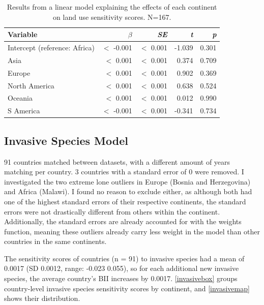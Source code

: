 \documentclass[11pt, a4paper, titlepage]{article}
\begin{document}
    \begin{table}[H]
    	\begin{center}
    		\caption{Results from a linear model explaining the effects of each continent on land use sensitivity scores. \textmd{N=167.}}
    		\label{tab:landuse}
    		\begin{tabular}{l|r|r|r|r} %
    			Variable & $\beta$ & \textit{SE} & \textit{t} & \textit{p}\\
    			\hline
    			Intercept (reference: Africa) & $<$ -0.001 & $<$ 0.001 & -1.039 & 0.301\\
    			Asia & $<$ 0.001 & $<$ 0.001 & 0.374 & 0.709\\
    			Europe & $<$ 0.001 & $<$ 0.001 & 0.902 & 0.369 \\
    			North America & $<$ 0.001 & $<$ 0.001 & 0.638 & 0.524\\
    			Oceania & $<$ 0.001 & $<$ 0.001 & 0.012 & 0.990\\
    			S America & $<$ -0.001 & $<$ 0.001 & -0.341 & 0.734\\
    		\end{tabular}
    	\end{center}
    \end{table}
    
    \newpage
	\subsection*{Invasive Species Model}

	
	91 countries matched between datasets, with a different amount of years matching per country. 3 countries with a standard error of 0 were removed. I investigated the two extreme lone outliers in Europe  (Bosnia and Herzegovina) and Africa (Malawi). I found no reason to exclude either, as although both had one of the highest standard errors of their respective continents, the standard errors were not drastically different from others within the continent. Additionally, the standard errors are already accounted for with the weights function, meaning these outliers already carry less weight in the model than other countries in the same continents.
	
	The sensitivity scores of countries (n = 91) to invasive species had a mean of 0.0017 (SD 0.0012, range: -0.023  0.055), so for each additional new invasive species, the average country's BII increases by 0.0017. \autoref{invasivebox} groups country-level invasive species sensitivity scores by continent, and \autoref{invasivemap} shows their distribution. \newline
\end{document}
